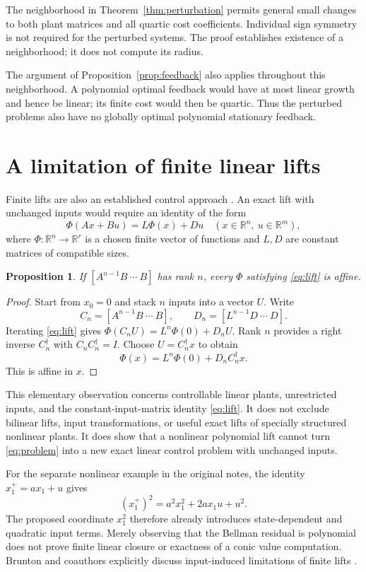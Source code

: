 \documentclass[10pt]{article}
\newtheorem{proposition}{Proposition}
\newcommand{\R}{\mathbb R}
\begin{document}
The neighborhood in Theorem~\ref{thm:perturbation} permits general small changes to both plant matrices and all quartic cost coefficients. Individual sign symmetry is not required for the perturbed systems. The proof establishes existence of a neighborhood; it does not compute its radius.

The argument of Proposition~\ref{prop:feedback} also applies throughout this neighborhood. A polynomial optimal feedback would have at most linear growth and hence be linear; its finite cost would then be quartic. Thus the perturbed problems also have no globally optimal polynomial stationary feedback.

\section{A limitation of finite linear lifts}

Finite lifts are also an established control approach \cite{brunton}. An exact lift with unchanged inputs would require an identity of the form
\begin{equation}
 \Phi(Ax+Bu)=L\Phi(x)+Du
 \quad(x\in\R^n,\ u\in\R^m),
 \label{eq:lift}
\end{equation}
where $\Phi:\R^n\to\R^r$ is a chosen finite vector of functions and $L,D$ are constant matrices of compatible sizes.

\begin{proposition}
If $[A^{n-1}B\ \cdots\ B]$ has rank $n$, every $\Phi$ satisfying \eqref{eq:lift} is affine.
\label{prop:lift}
\end{proposition}
\begin{proof}
Start from $x_0=0$ and stack $n$ inputs into a vector $U$. Write
\[
 C_n=[A^{n-1}B\ \cdots\ B],\qquad
 D_n=[L^{n-1}D\ \cdots\ D].
\]
Iterating \eqref{eq:lift} gives $\Phi(C_nU)=L^n\Phi(0)+D_nU$. Rank $n$ provides a right inverse $C_n^\dagger$ with $C_nC_n^\dagger=I$. Choose $U=C_n^\dagger x$ to obtain
\[
 \Phi(x)=L^n\Phi(0)+D_nC_n^\dagger x.
\]
This is affine in $x$.
\end{proof}

This elementary observation concerns controllable linear plants, unrestricted inputs, and the constant-input-matrix identity \eqref{eq:lift}. It does not exclude bilinear lifts, input transformations, or useful exact lifts of specially structured nonlinear plants. It does show that a nonlinear polynomial lift cannot turn \eqref{eq:problem} into a new exact linear control problem with unchanged inputs.

For the separate nonlinear example in the original notes, the identity $x_1^+=a x_1+u$ gives
\[
 (x_1^+)^2=a^2x_1^2+2ax_1u+u^2.
\]
The proposed coordinate $x_1^2$ therefore already introduces state-dependent and quadratic input terms. Merely observing that the Bellman residual is polynomial does not prove finite linear closure or exactness of a conic value computation. Brunton and coauthors explicitly discuss input-induced limitations of finite lifts \cite[Section 5.2]{brunton}.
\end{document}
